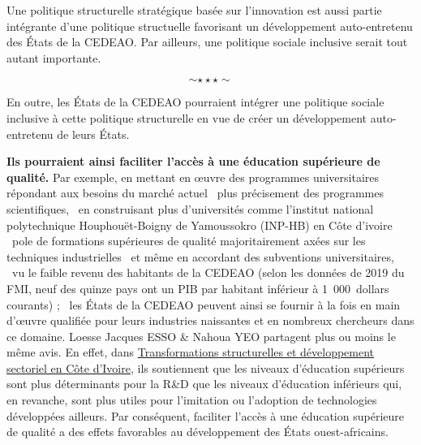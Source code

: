 	 \hspace*{0.5cm}Une politique structurelle stratégique basée sur l'innovation est aussi partie intégrante d'une politique structuelle favorisant un développement auto-entretenu des \'Etats de la CEDEAO. Par ailleurs, une politique sociale inclusive serait tout autant importante.
	 
	 $$\sim\star\star\star\sim$$
	 
	 \hspace*{0.5cm} En outre, les \'Etats de la CEDEAO pourraient intégrer une politique sociale inclusive à cette politique structurelle en vue de créer un développement auto-entretenu de leurs \'Etats.
	 
	 \hspace*{0.5cm}\textbf{Ils pourraient ainsi faciliter l'accès à une éducation supérieure de qualité.} Par exemple, en mettant en \oe uvre des programmes universitaires répondant aux besoins du marché actuel \textendash\ plus précisement des programmes scientifiques, \textendash\ en construisant plus d'universités comme l'institut national polytechnique Houphouët-Boigny de Yamoussokro \mbox{(INP-HB)} en Côte d'ivoire \textendash\ pole de formations supérieures de qualité majoritairement axées sur les techniques industrielles \textendash\ et même en accordant des subventions universitaires, \textendash\ vu le faible revenu des habitants de la CEDEAO (selon les données de 2019 du FMI, neuf des quinze pays ont un PIB par habitant inférieur à \mbox{1 000 dollars} courants) ; \textendash\ les \'Etats de la CEDEAO peuvent ainsi se fournir à la fois en main d'\oe uvre qualifiée pour leurs industries naissantes et en nombreux chercheurs dans ce domaine. Loesse Jacques ESSO \& Nahoua YEO partagent plus ou moins le même avis. En effet, dans \uline{Transformations structurelles et développement sectoriel en Côte d'Ivoire}, ils soutiennent que les niveaux d'éducation supérieurs sont plus déterminants pour la R\&D que les niveaux d'éducation inférieurs qui, en revanche, sont plus utiles pour l'imitation ou l'adoption de technologies développées ailleurs. Par conséquent, faciliter l'accès à une éducation supérieure de qualité a des effets favorables au développement des \'Etats ouest-africains.
	 
